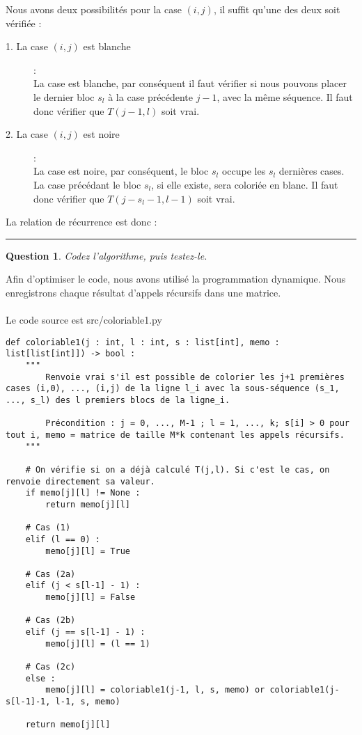 \documentclass[a4paper,12pt]{article}
\newtheorem{exo}{Question}
\begin{document}
Nous avons deux possibilités pour la case $(i,j)$, il suffit qu'une des deux soit vérifiée :
\begin{description}
	\item[1. La case $(i,j)$ est blanche] :\\
	La case est blanche, par conséquent il faut vérifier si nous pouvons placer le dernier bloc $s_l$ à la case précédente $j-1$, avec la même séquence. Il faut donc vérifier que $T(j-1, l)$ soit vrai.

	\item[2. La case $(i,j)$ est noire] :\\
	La case est noire, par conséquent, le bloc $s_l$ occupe les $s_l$ dernières cases. La case précédant le bloc $s_l$, si elle existe, sera coloriée en blanc. Il faut donc vérifier que $T(j-s_l-1, l-1)$ soit vrai.
\end{description}

La relation de récurrence est  donc : 
\\

\noindent\rule{\textwidth}{1pt}


\begin{exo}
	Codez l'algorithme, puis testez-le.
\end{exo}

Afin d'optimiser le code, nous avons utilisé la programmation dynamique. Nous enregistrons chaque résultat d'appels récursifs dans une matrice.\\\\
Le code source est src/coloriable1.py\\

\newpage

\begin{lstlisting}
def coloriable1(j : int, l : int, s : list[int], memo : list[list[int]]) -> bool :
    """
        Renvoie vrai s'il est possible de colorier les j+1 premières cases (i,0), ..., (i,j) de la ligne l_i avec la sous-séquence (s_1, ..., s_l) des l premiers blocs de la ligne_i.
    
        Précondition : j = 0, ..., M-1 ; l = 1, ..., k; s[i] > 0 pour tout i, memo = matrice de taille M*k contenant les appels récursifs.
    """
        
    # On vérifie si on a déjà calculé T(j,l). Si c'est le cas, on renvoie directement sa valeur.
    if memo[j][l] != None :
        return memo[j][l]
    
    # Cas (1)
    elif (l == 0) :
        memo[j][l] = True
        
    # Cas (2a)
    elif (j < s[l-1] - 1) :
        memo[j][l] = False
        
    # Cas (2b)
    elif (j == s[l-1] - 1) :
        memo[j][l] = (l == 1)
    
    # Cas (2c)  
    else :
        memo[j][l] = coloriable1(j-1, l, s, memo) or coloriable1(j-s[l-1]-1, l-1, s, memo)
        
    return memo[j][l]
\end{lstlisting}
\end{document}
